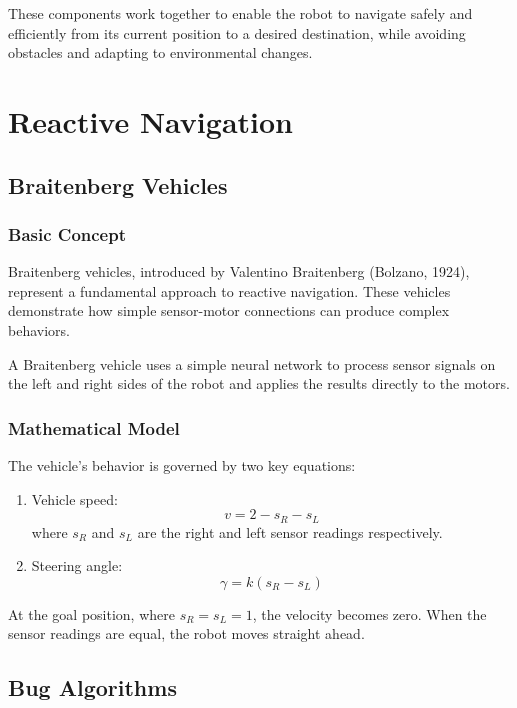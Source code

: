 \documentclass[openany]{book}
\theoremstyle{definition}
\theoremstyle{remark}
\newcommand{\definitionbox}[1]{
\begin{tcolorbox}[colback=blue!5,colframe=blue!40!black,title=Definition]
 #1
\end{tcolorbox}
}
\newcommand{\note}[1]{
\begin{tcolorbox}[colback=green!5,colframe=green!40!black,title=Note]
 #1
\end{tcolorbox}
}
\begin{document}
These components work together to enable the robot to navigate safely and efficiently from its current position to a desired destination, while avoiding obstacles and adapting to environmental changes.

\chapter{Reactive Navigation}

\section{Braitenberg Vehicles}

\subsection{Basic Concept}
Braitenberg vehicles, introduced by Valentino Braitenberg (Bolzano, 1924), represent a fundamental approach to reactive navigation. These vehicles demonstrate how simple sensor-motor connections can produce complex behaviors.

\definitionbox{A Braitenberg vehicle uses a simple neural network to process sensor signals on the left and right sides of the robot and applies the results directly to the motors.}

\subsection{Mathematical Model}
The vehicle's behavior is governed by two key equations:

\begin{enumerate}
    \item Vehicle speed:
    \begin{equation}
        v = 2 - s_R - s_L
    \end{equation}
    where $s_R$ and $s_L$ are the right and left sensor readings respectively.
    
    \item Steering angle:
    \begin{equation}
        \gamma = k(s_R - s_L)
    \end{equation}
\end{enumerate}

\note{At the goal position, where $s_R = s_L = 1$, the velocity becomes zero. When the sensor readings are equal, the robot moves straight ahead.}

\section{Bug Algorithms}
\end{document}
